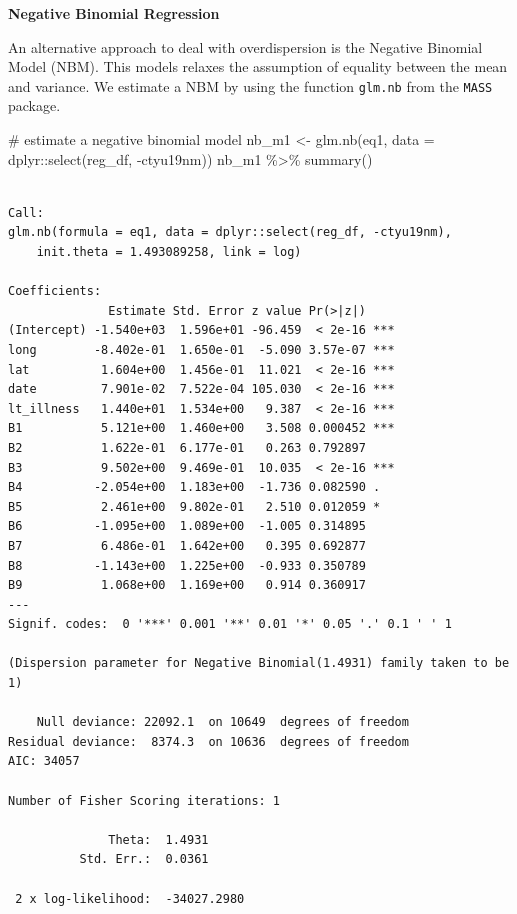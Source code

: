 \documentclass[
  letterpaper,
  DIV=11,
  numbers=noendperiod,
  oneside]{scrreprt}
\newenvironment{Shaded}{\begin{snugshade}}{\end{snugshade}}
\newcommand{\AttributeTok}[1]{\textcolor[rgb]{0.40,0.45,0.13}{#1}}
\newcommand{\CommentTok}[1]{\textcolor[rgb]{0.37,0.37,0.37}{#1}}
\newcommand{\FunctionTok}[1]{\textcolor[rgb]{0.28,0.35,0.67}{#1}}
\newcommand{\NormalTok}[1]{\textcolor[rgb]{0.00,0.23,0.31}{#1}}
\newcommand{\OtherTok}[1]{\textcolor[rgb]{0.00,0.23,0.31}{#1}}
\newcommand{\SpecialCharTok}[1]{\textcolor[rgb]{0.37,0.37,0.37}{#1}}
\begin{document}
\textbf{Negative Binomial Regression}

An alternative approach to deal with overdispersion is the Negative
Binomial Model (NBM). This models relaxes the assumption of equality
between the mean and variance. We estimate a NBM by using the function
\texttt{glm.nb} from the \texttt{MASS} package.

\begin{Shaded}
\begin{Highlighting}[]
\CommentTok{\# estimate a negative binomial model}
\NormalTok{nb\_m1 }\OtherTok{\textless{}{-}} \FunctionTok{glm.nb}\NormalTok{(eq1, }
       \AttributeTok{data =}\NormalTok{ dplyr}\SpecialCharTok{::}\FunctionTok{select}\NormalTok{(reg\_df, }\SpecialCharTok{{-}}\NormalTok{ctyu19nm))}
\NormalTok{nb\_m1 }\SpecialCharTok{\%\textgreater{}\%} \FunctionTok{summary}\NormalTok{()}
\end{Highlighting}
\end{Shaded}

\begin{verbatim}

Call:
glm.nb(formula = eq1, data = dplyr::select(reg_df, -ctyu19nm), 
    init.theta = 1.493089258, link = log)

Coefficients:
              Estimate Std. Error z value Pr(>|z|)    
(Intercept) -1.540e+03  1.596e+01 -96.459  < 2e-16 ***
long        -8.402e-01  1.650e-01  -5.090 3.57e-07 ***
lat          1.604e+00  1.456e-01  11.021  < 2e-16 ***
date         7.901e-02  7.522e-04 105.030  < 2e-16 ***
lt_illness   1.440e+01  1.534e+00   9.387  < 2e-16 ***
B1           5.121e+00  1.460e+00   3.508 0.000452 ***
B2           1.622e-01  6.177e-01   0.263 0.792897    
B3           9.502e+00  9.469e-01  10.035  < 2e-16 ***
B4          -2.054e+00  1.183e+00  -1.736 0.082590 .  
B5           2.461e+00  9.802e-01   2.510 0.012059 *  
B6          -1.095e+00  1.089e+00  -1.005 0.314895    
B7           6.486e-01  1.642e+00   0.395 0.692877    
B8          -1.143e+00  1.225e+00  -0.933 0.350789    
B9           1.068e+00  1.169e+00   0.914 0.360917    
---
Signif. codes:  0 '***' 0.001 '**' 0.01 '*' 0.05 '.' 0.1 ' ' 1

(Dispersion parameter for Negative Binomial(1.4931) family taken to be 1)

    Null deviance: 22092.1  on 10649  degrees of freedom
Residual deviance:  8374.3  on 10636  degrees of freedom
AIC: 34057

Number of Fisher Scoring iterations: 1

              Theta:  1.4931 
          Std. Err.:  0.0361 

 2 x log-likelihood:  -34027.2980 
\end{verbatim}
\end{document}
